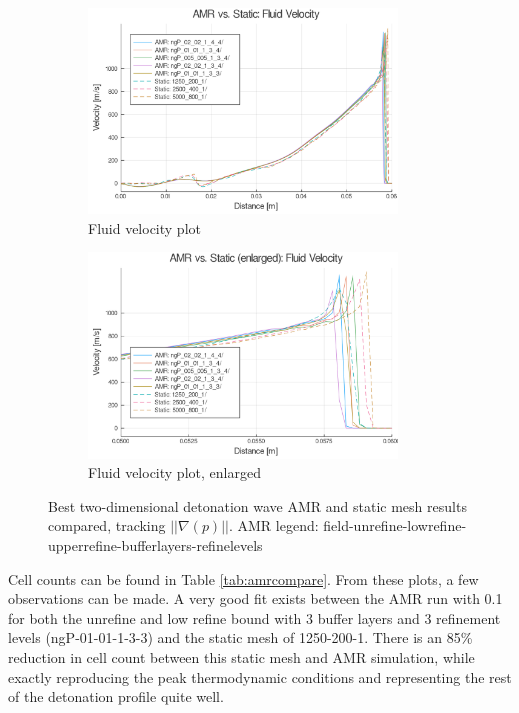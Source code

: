 \begin{figure} \ContinuedFloat
    
    \centering
    \begin{subfigure}[]{\textwidth}
        \centering
        \includegraphics[width=0.9\textwidth]{./figs/amrfigs/amrcompare/u.png}
        \caption{Fluid velocity plot}
    \end{subfigure}

    \centering
    \begin{subfigure}[]{\textwidth}
        \centering
        \includegraphics[width=0.9\textwidth]{./figs/amrfigs/amrcompare/ue.png}
        \caption{Fluid velocity plot, enlarged}
    \end{subfigure}

    \caption{Best two-dimensional detonation wave AMR and static mesh results compared, tracking \( ||\nabla(p)||\). AMR legend: field-unrefine-lowrefine-upperrefine-bufferlayers-refinelevels}
    \label{fig:amrcompare}
\end{figure}%
\noindent Cell counts can be found in Table \ref{tab:amrcompare}. From these plots, a few observations can be made. A very good fit exists between the AMR run with 0.1 for both the unrefine and low refine bound with 3 buffer layers and 3 refinement levels (ngP-01-01-1-3-3) and the static mesh of 1250-200-1. There is an 85\% reduction in cell count between this static mesh and AMR simulation, while exactly reproducing the peak thermodynamic conditions and representing the rest of the detonation profile quite well. 


